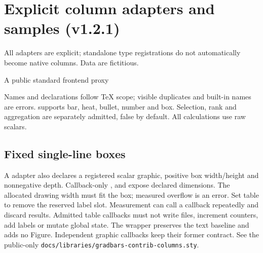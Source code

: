\section{Explicit column adapters and samples (v1.2.1)}
All adapters are explicit; standalone type registrations do not automatically become native columns. Data are fictitious.
\begin{demo}{A public standard frontend proxy}
\begingroup
{}
\begin{gradtable}[style=adapter-report,width=\linewidth]
\end{gradtable}
\endgroup
\end{demo}
Names and declarations follow TeX scope; visible duplicates and built-in names are errors.  supports bar, heat, bullet, number and box. Selection, rank and aggregation are separately admitted, false by default. All calculations use raw scalars.
\subsection{Fixed single-line boxes}
A  adapter also declares a registered scalar graphic, positive box width/height and nonnegative depth. Callback-only \key{\gradbarscolumnwidth}, \key{\gradbarscolumnheight} and \key{\gradbarscolumndepth} expose declared dimensions. The allocated drawing width must fit the box; measured overflow is an error. Set table  to remove the reserved label slot.
Measurement can call a callback repeatedly and discard results. Admitted table callbacks must not write files, increment counters, add labels or mutate global state. The wrapper preserves the text baseline and adds no Figure. Independent graphic callbacks keep their former contract. See the public-only \texttt{docs/libraries/gradbars-contrib-columns.sty}.
\clearpage
